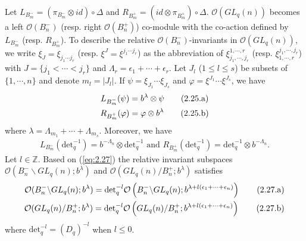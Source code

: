 \documentclass[table,a4paper,reqno]{amsart}
\numberwithin{equation}{section}
\theoremstyle{definition}
\begin{document}
Let $L_{B_m^-}=(\pi_{B_m^-}\otimes id)\circ\Delta$ and $R_{B_m^+}=(id\otimes\pi_{B_m^+})\circ\Delta$. $\mathcal{O}(GL_q(n))$ becomes a left $\mathcal{O}(B_n^-)$ (resp. right $\mathcal{O}( B_n^+)$) co-module with the co-action defined by $L_{B_m^-}$ (resp. $R_{B_m^+}$). To describe the relative $\mathcal{O}(B_n^-)$-invariants in $\mathcal{O}(GL_q(n))$, we write $\xi_J=\xi_{j_1\cdots j_r}$ (resp. $\xi^J=\xi^{j_1\cdots j_r}$) as the abbreviation of $\xi_{j_1,\cdots,j_r}^{1,\cdots,r}$ (resp. $\xi^{j_1,\cdots,j_r}_{1,\cdots,r}$) with $J=\{j_1<\cdots<j_r\}$ and $\Lambda_r=\epsilon_1+\cdots+\epsilon_r$. Let $J_l$ ($1\le l\le s$) be subsets of $\{1,\cdots,n\}$ and denote $m_l=|J_l|$. If $\psi=\xi_{J_1}\cdots\xi_{J_s}$ and $\varphi=\xi^{J_1}\cdots\xi^{J_s}$, we have
\begin{align}\stepcounter{equation}
    L_{B_m^-}(\psi)&=b^\lambda\otimes\psi\tag{2.25.a}\label{eq:2.26.a}\\
    R_{B_m^+}(\varphi)&=\varphi\otimes b^\lambda\tag{2.25.b}\label{eq:2.26.b}
\end{align}
where $\lambda=\Lambda_{m_1}+\cdots+\Lambda_{m_s}$. Moreover, we have
\begin{align}\label{eq:2.27}
     L_{B_m^-}(\text{det}_q^{-1})=b^{-\Lambda_n}\otimes \text{det}_q^{-1}\text{ and }R_{B_m^+}(\text{det}_q^{-1})=\text{det}_q^{-1}\otimes b^{-\Lambda_n}.
\end{align}
Let $l\in\mathbb{Z}$. Based on (\ref{eq:2.27}) the relative invariant subspaces $\mathcal{O}(B_n^-\backslash GL_q(n);b^\lambda)$ and $\mathcal{O}( GL_q(n)/B_n^+;b^\lambda)$ satisfies
\begin{align}\stepcounter{equation}
    \mathcal{O}(B_n^-\backslash GL_q(n);b^\lambda)=\text{det}_q^{-l}\mathcal{O}\left(B_n^-\backslash GL_q(n);b^{\lambda+l(\epsilon_1+\cdots+\epsilon_n)}\right)\tag{2.27.a}\label{eq:2.28.a}\\
    \mathcal{O}( GL_q(n)/B_n^+;b^\lambda)=\text{det}_q^{-l}\mathcal{O}\left( GL_q(n)/B_n^+;b^{\lambda+l(\epsilon_1+\cdots+\epsilon_n)}\right)\tag{2.27.b}\label{eq:2.28.b}
\end{align}
where $\text{det}_q^{-l}=(D_q)^{-l}$ when $l\le 0$.
\end{document}
